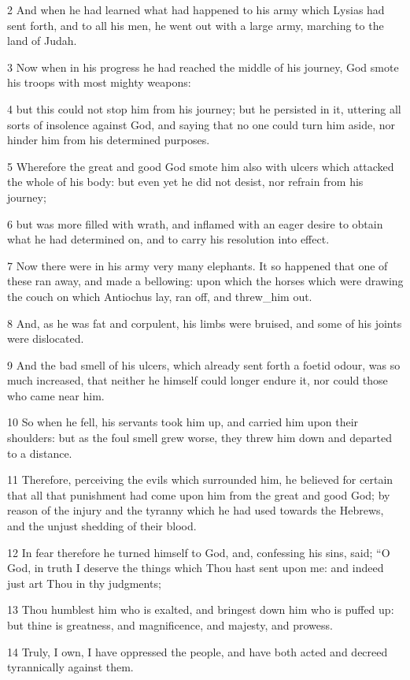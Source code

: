 2 And when he had learned what had happened to his army which Lysias had sent forth, and to all his men, he went out with a large army, marching to the land of Judah. 

3 Now when in his progress he had reached the middle of his journey, God smote his troops with most mighty weapons: 

4 but this could not stop him from his journey; but he persisted in it, uttering all sorts of insolence against God, and saying that no one could turn him aside, nor hinder him from his determined purposes. 

5 Wherefore the great and good God smote him also with ulcers which attacked the whole of his body: but even yet he did not desist, nor refrain from his journey; 

6 but was more filled with wrath, and inflamed with an eager desire to obtain what he had determined on, and to carry his resolution into effect. 

7 Now there were in his army very many elephants. It so happened that one of these ran away, and made a bellowing: upon which the horses which were drawing the couch on which Antiochus lay, ran off, and threw_him out. 

8 And, as he was fat and corpulent, his limbs were bruised, and some of his joints were dislocated. 

9 And the bad smell of his ulcers, which already sent forth a foetid odour, was so much increased, that neither he himself could longer endure it, nor could those who came near him. 

10 So when he fell, his servants took him up, and carried him upon their shoulders: but as the foul smell grew worse, they threw him down and departed to a distance. 

11 Therefore, perceiving the evils which surrounded him, he believed for certain that all that punishment had come upon him from the great and good God; by reason of the injury and the tyranny which he had used towards the Hebrews, and the unjust shedding of their blood. 

12 In fear therefore he turned himself to God, and, confessing his sins, said; “O God, in truth I deserve the things which Thou hast sent upon me: and indeed just art Thou in thy judgments; 

13 Thou humblest him who is exalted, and bringest down him who is puffed up: but thine is greatness, and magnificence, and majesty, and prowess. 

14 Truly, I own, I have oppressed the people, and have both acted and decreed tyrannically against them. 

